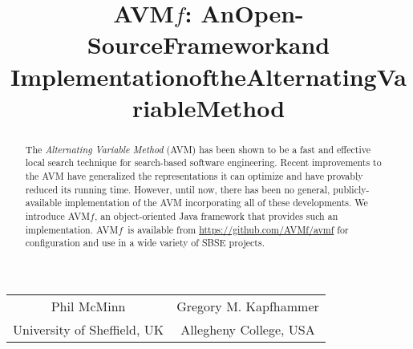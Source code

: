 \documentclass{llncs}
\newcommand{\AVM}{Alternating Variable Method\xspace}
\newcommand{\name}{AVM\hspace{-1pt}$f$\xspace}
\newcommand{\repourl}{\url{https://github.com/AVMf/avmf}\xspace}
\begin{document}
\title{\texorpdfstring{\name: An\:Open-Source\:Framework\:and\\$\!$Implementation\:of\:the\:Alternating\:Variable\:Method\vspace{-.5em}}{}}
\author{} %
\institute{} %
\maketitle

\vspace{-1em}
\begin{center}
\begin{tabular}{c@{\hskip 3em}c}
    Phil McMinn & Gregory M. Kapfhammer \\
    {\small University of Sheffield, UK} & {\small Allegheny College, USA} \\
\end{tabular}
\end{center}
\vspace{-1em}


\begin{abstract}
The {\it \AVM} (AVM) has been shown to be a fast and effective local search technique for %
search-based software engineering.
%
Recent improvements to the AVM have generalized the 
representations it can optimize and have provably reduced its running time.
However, until now, there has been no general, publicly-available 
implementation of the AVM 
incorporating 
all of these developments. 
We introduce \name, an object-oriented 
Java framework 
that provides 
such an implementation. \name~is available from \repourl for configuration and use in a wide variety of SBSE projects.\vspace{-1ex}
\end{abstract}

\vspace{-2em}
\end{document}
